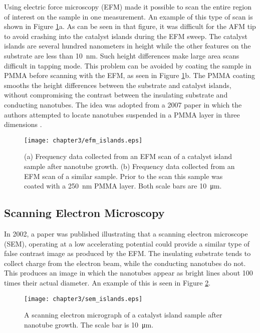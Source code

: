Using electric force microscopy (EFM) made it possible to scan the entire region of interest on the sample in one measurement. An example of this type of scan is shown in Figure \ref{fig:efm_islands}a. As can be seen in that figure, it was difficult for the AFM tip to avoid crashing into the catalyst islands during the EFM sweep. The catalyst islands are several hundred nanometers in height while the other features on the substrate are less than \SI{10}{\nano\meter}. Such height differences make large area scans difficult in tapping mode. This problem can be avoided by coating the sample in PMMA before scanning with the EFM, as seen in Figure \ref{fig:efm_islands}b. The PMMA coating smooths the height differences between the substrate and catalyst islands, without compromising the contrast between the insulating substrate and conducting nanotubes. The idea was adopted from a 2007 paper in which the authors attempted to locate nanotubes suspended in a PMMA layer in three dimensions \cite{Jespersen2007}.

\begin{figure}
	\centering
	\texttt{[image: chapter3/efm\_islands.eps]}
	\caption{(a) Frequency data collected from an EFM scan of a catalyst island sample after nanotube growth. (b) Frequency data collected from an EFM scan of a similar sample. Prior to the scan this sample was coated with a \SI{250}{\nano\meter} PMMA layer. Both scale bars are \SI{10}{\micro\meter}. }
	\label{fig:efm_islands}
\end{figure}

\subsection{Scanning Electron Microscopy}
\label{subsec:imaging_sem}

In 2002, a paper \cite{Brintlinger2002} was published illustrating that a scanning electron microscope (SEM), operating at a low accelerating potential could provide a similar type of false contrast image as produced by the EFM. The insulating substrate tends to collect charge from the electron beam, while the conducting nanotubes do not. This produces an image in which the nanotubes appear as bright lines about 100 times their actual diameter. An example of this is seen in Figure \ref{fig:sem_islands}. 

\begin{figure}
	\centering
	\texttt{[image: chapter3/sem\_islands.eps]}
	\caption{A scanning electron micrograph of a catalyst island sample after nanotube growth. The scale bar is \SI{10}{\micro\meter}.}
	\label{fig:sem_islands}
\end{figure}

